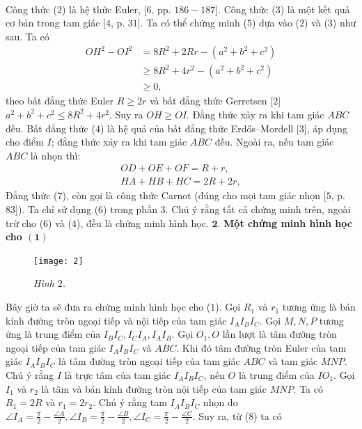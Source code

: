 \begin{multicols}{2}
\begin{align*}
	\end{align*}
	Công thức ($2$) là hệ thức Euler, [$6$, pp. $186-187$]. Công thức ($3$) là một kết quả cơ bản trong tam giác [$4$, p. $31$]. Ta có thể chứng minh ($5$) dựa vào ($2$) và ($3$) như sau. Ta có 
	\begin{align*}
		OH^2-OI^2&=8R^2+2Rr-(a^2+b^2+c^2)\\
		&\ge 8R^2+4r^2- (a^2+b^2+c^2)\\
		&\ge 0,
	\end{align*}
	theo bất đẳng thức Euler $R\ge 2r$ và bất đẳng thức Gerretsen [$2$] $a^2+b^2+c^2\le 8R^2+4r^2$. Suy ra $OH\ge OI$.
	Đẳng thức xảy ra khi tam giác $ABC$ đều.
	\vskip 0.05cm
	Bất đẳng thức ($4$) là hệ quả của bất đẳng thức Erd\H{o}s--Mordell [$3$], áp dụng cho điểm $I$; đẳng thức xảy ra khi tam giác $ABC$ đều.
	\vskip 0.05cm
	Ngoài ra, nếu tam giác $ABC$ là nhọn thì:
	\begin{align*}
		OD+OE+OF=R+r, \tag{$7$}   \\ 
		HA+HB+HC=2R+2r,    \tag{$8$}
	\end{align*}
	Đẳng thức ($7$), còn gọi là công thức Carnot (đúng cho mọi tam giác nhọn [$5$, p. $83$]).  
	Ta chỉ sử dụng ($6$) trong phần $3$.
	Chú ý rằng tất cả chứng minh trên, ngoài trừ cho ($6$) và ($4$), đều là chứng minh hình học. 
	\vskip 0.05cm
	$\pmb{2.}$ \textbf{\color{hoccungpi}Một chứng minh hình học cho $\pmb{(1)}$}
	\begin{figure}[H]
		\vspace*{-5pt}
		\centering
		\captionsetup{labelformat= empty, justification=centering}
		\texttt{[image: 2]}
		\caption{\small\textit{\color{hoccungpi}Hình $2$.}}
		\vspace*{-10pt}
	\end{figure}
	Bây giờ ta sẽ đưa ra chứng minh hình học cho ($1$).
	\vskip 0.05cm
	Gọi $R_1$ và $r_1$ tương ứng là bán kính đường tròn ngoại tiếp và nội tiếp của tam giác  $I_AI_BI_C$.
	Gọi $M,N,P$ tương ứng là trung điểm của $I_BI_C,I_CI_A,I_AI_B$. Gọi $O_1,O$ lần lượt là tâm đường tròn ngoại tiếp của tam giác $I_AI_BI_C$ và $ABC$. Khi đó tâm đường tròn Euler của tam giác $I_AI_BI_C$ là tâm đường tròn ngoại tiếp của tam giác $ABC$ và tam giác $MNP$. Chú ý rằng $I$ là trực tâm của tam giác $I_AI_BI_C$, nên $O$ là trung điểm của $IO_1$. Gọi $I_1$ và $r_2$ là tâm và bán kính đường tròn nội tiếp của tam giác $MNP$. Ta có $R_1=2R$ và $r_1=2r_2$. Chú ý rằng tam $I_AI_BI_C$ nhọn do $\angle I_A= \frac{\pi}{2}-\frac{\angle A}{2},  \angle I_B= \frac{\pi}{2}-\frac{\angle B}{2}, \angle I_C= \frac{\pi}{2}-\frac{\angle C}{2}$. Suy ra, từ ($8$) ta có 

\end{multicols}
